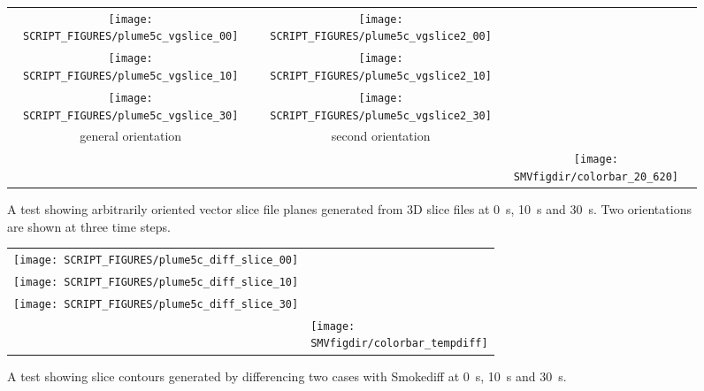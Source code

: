 \documentclass[11pt,twoside]{book}
\begin{document}
\begin{figure}[bph]
\begin{center}
\begin{tabular}{cccp{1.0in}}
 \texttt{[image: SCRIPT\_FIGURES/plume5c\_vgslice\_00]}&
 \texttt{[image: SCRIPT\_FIGURES/plume5c\_vgslice2\_00]}\\

 \texttt{[image: SCRIPT\_FIGURES/plume5c\_vgslice\_10]}&
 \texttt{[image: SCRIPT\_FIGURES/plume5c\_vgslice2\_10]}\\

 \texttt{[image: SCRIPT\_FIGURES/plume5c\_vgslice\_30]}&
 \texttt{[image: SCRIPT\_FIGURES/plume5c\_vgslice2\_30]}\\

 general orientation&second orientation\\
 &&\raisebox{0.5in}[0pt]{\texttt{[image: \\SMVfigdir/colorbar\_20\_620]}}\\
 \end{tabular}
\end{center}
 \caption[A test showing arbitrarily oriented vector slice file planes generated from
 3D slice files]{A test showing arbitrarily oriented vector slice file planes generated
 from 3D slice files at \SI{0}{s}, \SI{10}{s} and \SI{30}{s}.  Two orientations are
 shown at three time steps. }
\label{figvgslicetest}%
\end{figure}

\begin{figure}[bph]
\begin{center}
\begin{tabular}{cp{1.0in}}
 \texttt{[image: SCRIPT\_FIGURES/plume5c\_diff\_slice\_00]}\\
 \texttt{[image: SCRIPT\_FIGURES/plume5c\_diff\_slice\_10]}\\
 \texttt{[image: SCRIPT\_FIGURES/plume5c\_diff\_slice\_30]}\\
&\raisebox{0.5in}[0pt]{\texttt{[image: \\SMVfigdir/colorbar\_tempdiff]}}\\
 \end{tabular}
\end{center}
 \caption[A test showing slice contours generated by differencing two cases with
 Smokediff]{A test showing slice contours generated by differencing
 two cases with Smokediff  at \SI{0}{s}, \SI{10}{s} and \SI{30}{s}.}
\label{figdiffslicetest}%
\end{figure}
\end{document}
